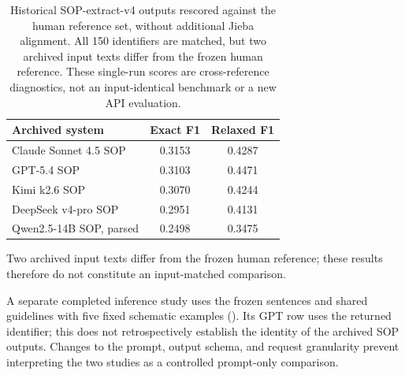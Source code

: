 \begin{table}[htbp]
\caption{Historical SOP-extract-v4 outputs rescored against the human reference set, without additional Jieba alignment. All 150 identifiers are matched, but two archived input texts differ from the frozen human reference. These single-run scores are cross-reference diagnostics, not an input-identical benchmark or a new API evaluation.}
\label{tab:appendix-f-sop}
\centering
\small
\begin{tabularx}{\linewidth}{@{}Lcc@{}}
\toprule
Archived system & Exact F1 & Relaxed F1 \\
\midrule
Claude Sonnet 4.5 SOP & 0.3153 & 0.4287 \\
GPT-5.4 SOP & 0.3103 & 0.4471 \\
Kimi k2.6 SOP & 0.3070 & 0.4244 \\
DeepSeek v4-pro SOP & 0.2951 & 0.4131 \\
Qwen2.5-14B SOP, parsed & 0.2498 & 0.3475 \\
\bottomrule
\end{tabularx}
\end{table}

Two archived input texts differ from the frozen human reference; these results therefore do not constitute an input-matched comparison.

A separate completed inference study uses the frozen sentences and shared guidelines with five fixed schematic examples (). Its GPT row uses the returned identifier; this does not retrospectively establish the identity of the archived SOP outputs. Changes to the prompt, output schema, and request granularity prevent interpreting the two studies as a controlled prompt-only comparison.

